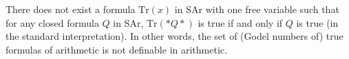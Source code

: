 There does not exist a formula $\mathrm{Tr}(x)$ in SAr with one free variable such that for any closed formula $Q$ in SAr, $\mathrm{Tr}(*Q*)$ is true if and only if $Q$ is true (in the standard interpretation). In other words, the set of (Godel numbers of) true formulas of arithmetic is not definable in arithmetic.
